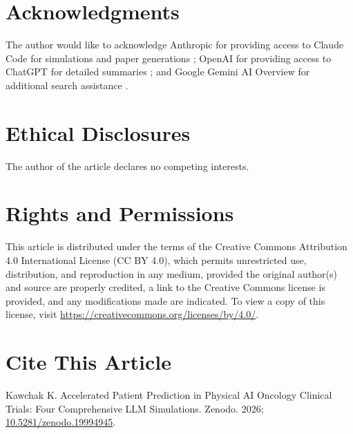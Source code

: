 
{}
\section*{Acknowledgments}
\label{sec:acknowledgments}

The author would like to acknowledge Anthropic for providing access to
Claude Code for simulations and paper generations \cite{claude-code,
claude-opus-47, claude-sonnet-46}; OpenAI for providing access to ChatGPT
for detailed summaries \cite{chatgpt-thinking}; and Google Gemini AI
Overview for additional search assistance \cite{google-gemini-overview}.

{}
\section*{Ethical Disclosures}
\label{sec:ethics}

The author of the article declares no competing interests.

{}
\section*{Rights and Permissions}
\label{sec:rights}

This article is distributed under the terms of the Creative Commons
Attribution 4.0 International License (CC BY 4.0), which permits
unrestricted use, distribution, and reproduction in any medium, provided
the original author(s) and source are properly credited, a link to the
Creative Commons license is provided, and any modifications made are
indicated. To view a copy of this license, visit
\url{https://creativecommons.org/licenses/by/4.0/}.

{}
\section*{Cite This Article}
\label{sec:cite}

Kawchak K. Accelerated Patient Prediction in Physical AI Oncology
Clinical Trials: Four Comprehensive LLM Simulations. Zenodo. 2026;
\href{https://doi.org/10.5281/zenodo.19994945}{10.5281/zenodo.19994945}.
